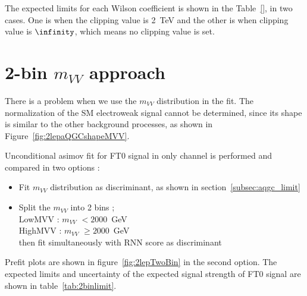 The expected limits for each Wilson coefficient is shown in the Table~\ref{}, in two cases. One is when the clipping value is 2~TeV and the other is when clipping value is $\infinity$, which means no clipping value is set.


\section{2-bin $m_{VV}$ approach}
\label{subsec:2binapproach}

There is a problem when we use the $m_{VV}$ distribution in the fit.
The normalization of the SM electroweak signal cannot be determined, since its shape is similar to the other background processes, as shown in Figure~\ref{fig:2lepaQGCshapeMVV}.

Unconditional asimov fit for FT0 signal in only \tlep channel is performed and compared in two options :
\begin{itemize}
  \item Fit $m_{VV}$ distribution as discriminant, as shown in section~\ref{subsec:aqgc_limit}
  \item Split the $m_{VV}$ into 2 bins ;  \\
        LowMVV : $m_{VV}$ $< 2000$~GeV \\
        HighMVV : $m_{VV}$ $\geq 2000$~GeV \\
        then fit simultaneously with RNN score as discriminant
\end{itemize}
Prefit plots are shown in figure~\ref{fig:2lepTwoBin} in the second option.
The expected limits and uncertainty of the expected signal strength of FT0 signal are shown in table~\ref{tab:2binlimit}.

